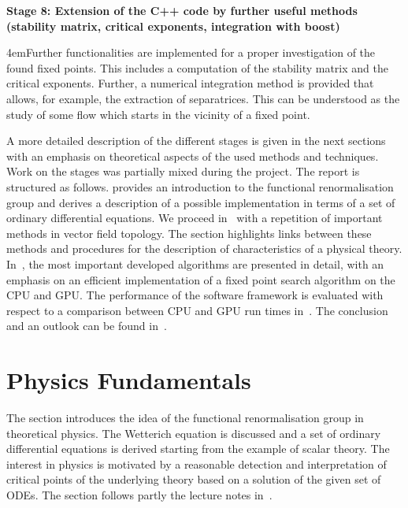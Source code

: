 \documentclass[paper=a4,11pt,bibliography=totoc]{scrartcl}
\begin{document}
\textbf{Stage 8: Extension of the C++ code by further useful methods (stability matrix, 
critical exponents, integration with boost)}
\begin{center}
	\leftskip4em\small Further functionalities are implemented for a proper investigation of the found fixed points. This includes a computation of the stability matrix and the critical exponents. Further, a numerical integration method is provided that allows, for example, the extraction of separatrices. This can be understood as the study of some flow which starts in the vicinity of a fixed point.
\end{center}


A more detailed description of the different stages is given in the next sections with an emphasis on theoretical aspects of the used methods and techniques. Work on the stages was partially mixed during the project. The report is structured as follows.  provides an introduction to the functional renormalisation group and derives a description of a possible implementation in terms of a set of ordinary differential equations. We proceed in~ with a repetition of important methods in vector field topology. The section highlights links between these methods and procedures for the description of characteristics of a physical theory. In~, the most important developed algorithms are presented in detail, with an emphasis on an efficient implementation of a fixed point search algorithm on the CPU and GPU. The performance of the software framework is evaluated with respect to a comparison between CPU and GPU run times in~. The conclusion and an outlook can be found in~.

\section{Physics Fundamentals}
\label{sec:physicsfunamentals}
%
The section introduces the idea of the functional renormalisation group in theoretical physics. The Wetterich equation is discussed and a set of ordinary differential equations is derived starting from the example of scalar theory. The interest in physics is motivated by a reasonable detection and interpretation of critical points of the underlying theory based on a solution of the given set of ODEs. The section follows partly the lecture notes in~\cite{Pawlowski2018}.
%
\end{document}

